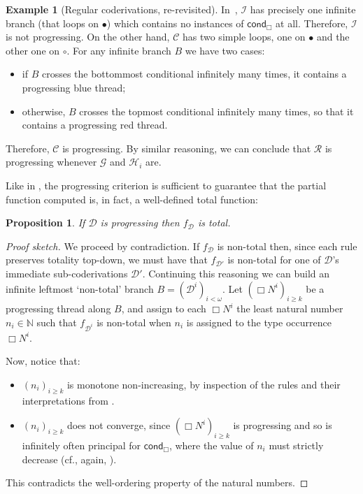 \documentclass[manuscript,screen]{acmart}
\newcommand{\red}[1]{{\color{red}#1}}
\newcommand{\blue}[1]{{\color{blue}#1}}
\newtheorem{prop}[thm]{Proposition}
\theoremstyle{definition}
\newtheorem{exmp}[thm]{Example}
\theoremstyle{remark}
\newcommand{\Nat}{\mathbb{N}}
\newcommand{\n}{N}
\newcommand{\sq}{\Box}
\newcommand{\sqn}{{\sq\n}}
\newcommand{\sn}{\sqn}
\newcommand{\cnd}{\mathsf{cond}}
\newcommand{\denot}[1]{f_{#1}}
\newcommand{\cconc}{\mathcal{C}}
\newcommand{\incrementation}{\mathcal{I}}
\newcommand{\successor}{\mathcal{S}}
\newcommand{\primrec}{\mathcal{R}}
\newcommand{\gfunction}{\mathcal{G}}
\newcommand{\hfunction}{\mathcal{H}}
\newcommand{\der}{\mathcal{D}}
\begin{document}
\begin{exmp}[Regular coderivations, re-revisited] In~,  $\incrementation$ has precisely one infinite branch (that loops on $\bullet$) which contains no instances of  $\cnd_{\sq}$ at all. Therefore, $\incrementation$ is not progressing. 
On the other hand, $\cconc$ has two simple loops, one on $\bullet$ and the other one on $\circ$. For any infinite branch $B$ we have two cases:
\begin{itemize}
    \item if $B$ crosses the bottommost conditional infinitely many times, it contains a progressing \blue{blue} thread;
    \item otherwise, $B$ crosses the topmost conditional infinitely many times, so that it  contains  a progressing \red{red} thread.
\end{itemize}
Therefore, $\cconc$ is progressing. By similar reasoning, we can conclude that $\primrec$ is progressing whenever $\gfunction$ and $\hfunction_i$ are.
\end{exmp}




Like in \cite{Kuperberg-Pous21,Das2021-preprint,Das2021}, the progressing criterion is sufficient to guarantee that the partial function computed is, in fact, a well-defined total function:

\begin{prop}
\label{prop:prog-total}
If $\der$ is progressing then $\denot \der$ is total.
\end{prop}
\begin{proof}
[Proof sketch]
We proceed by contradiction.
If $\denot \der$ is non-total then, since each rule preserves totality top-down, we must have that $\denot{\der'}$ is non-total for one of $\der$'s immediate sub-coderivations $\der'$.
Continuing this reasoning we can build an infinite leftmost `non-total' branch $B=(\der^{i})_{i<\omega}$.
Let $(\sn^i)_{i\geq k}$ be a progressing thread along $B$, and assign to each $\sn^i$ the least natural number $n_i \in \Nat$ such that $\denot{\der^{i}}$ is non-total when $n_i$ is assigned to the type occurrence $\sn^i$.

Now, notice that:
\begin{itemize}
    \item $(n_i)_{i\geq k}$ is monotone non-increasing, by inspection of the rules and their interpretations from .
    \item $(n_i)_{i\geq k}$ does not converge, since $(\sn^i)_{i\geq k}$ is progressing and so is infinitely often principal for $\cnd_\sq$, where the value of $n_i$ must strictly decrease (cf., again, ).
\end{itemize}
This contradicts the well-ordering property of the natural numbers.
\end{proof}
\end{document}
